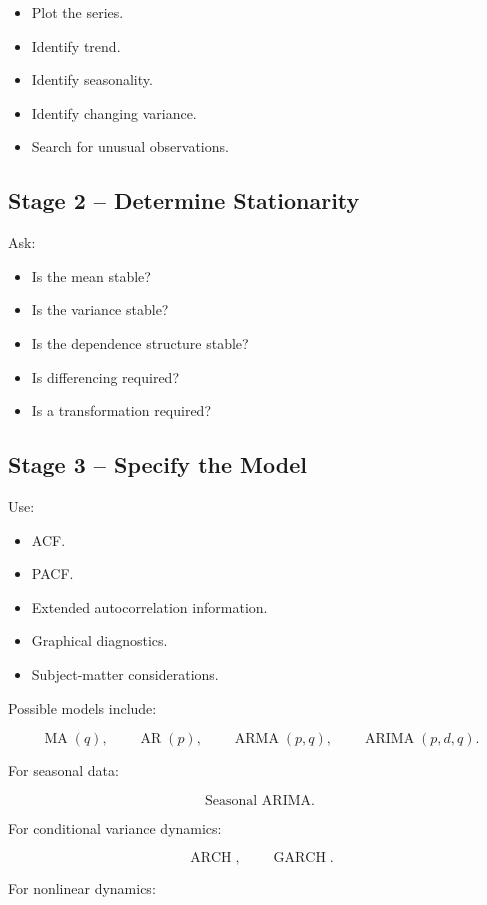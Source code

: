 \documentclass[11pt,a4paper]{article}
\newcommand{\AR}{\operatorname{AR}}
\newcommand{\MA}{\operatorname{MA}}
\newcommand{\ARMA}{\operatorname{ARMA}}
\newcommand{\ARIMA}{\operatorname{ARIMA}}
\newcommand{\GARCH}{\operatorname{GARCH}}
\newcommand{\ARCH}{\operatorname{ARCH}}
\begin{document}
\begin{itemize}
    \item Plot the series.
    \item Identify trend.
    \item Identify seasonality.
    \item Identify changing variance.
    \item Search for unusual observations.
\end{itemize}

\subsection{Stage 2 -- Determine Stationarity}

Ask:

\begin{itemize}
    \item Is the mean stable?
    \item Is the variance stable?
    \item Is the dependence structure stable?
    \item Is differencing required?
    \item Is a transformation required?
\end{itemize}

\subsection{Stage 3 -- Specify the Model}

Use:

\begin{itemize}
    \item ACF.
    \item PACF.
    \item Extended autocorrelation information.
    \item Graphical diagnostics.
    \item Subject-matter considerations.
\end{itemize}

Possible models include:

\[
\MA(q),\qquad
\AR(p),\qquad
\ARMA(p,q),\qquad
\ARIMA(p,d,q).
\]

For seasonal data:

\[
\text{Seasonal ARIMA}.
\]

For conditional variance dynamics:

\[
\ARCH,\qquad \GARCH.
\]

For nonlinear dynamics:
\end{document}
